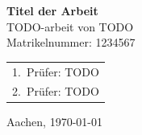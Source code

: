 \begin{titlepage}
    \vspace{-2cm}
    \vspace{0cm}
    \centering \textbf{\huge{
        Titel der Arbeit
    }}\\
    \vspace{1cm}
    \centering TODO-arbeit von TODO\\
    \centering Matrikelnummer: 1234567\\
    \vspace{0.5cm}
    \begin{center}
        \begin{tabular}{l}
            1.\ Prüfer: TODO \\
            2.\ Prüfer: TODO \\
        \end{tabular}
    \end{center}
    \vspace{0.5cm}
    \centering Aachen, \today\\
    \vspace{1.75cm}

\end{titlepage}
\pagebreak
